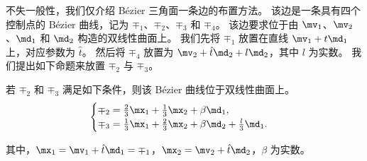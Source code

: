 不失一般性，我们仅介绍 B\'{e}zier 三角面一条边的布置方法。
该边是一条具有四个控制点的 B\'{e}zier 曲线，记为 $\mp_1$、$\mp_2$、$\mp_3$ 和 $\mp_4$。
该边要求位于由 $\mv_1$、$\mv_2$、$\md_1$ 和 $\md_2$ 构造的双线性曲面上。
%
我们先将 $\mp_1$ 放置在直线 $\mv_1 + t \md_1$ 上，对应参数为 $\hat{t}$。
然后将 $\mp_4$ 放置为 $\mv_2 + \hat{t} \md_2 + l \md_2$，其中 $l$ 为实数。
%
我们提出如下命题来放置 $\mp_2$ 与 $\mp_3$。
\begin{prop}\label{prop:bezier-curve}
    若 $\mp_2$ 和 $\mp_3$ 满足如下条件，则该 B\'{e}zier 曲线位于双线性曲面上。
\begin{equation}\label{equ:edge-control-1}
	\begin{cases}
		\mp_2= \frac{2}{3}\mx_1 + \frac{1}{3}\mx_2 + \beta \md_1, &\\
		\mp_3 = \frac{1}{3}\mx_1 + \frac{2}{3}\mx_2 + \beta \md_2+\frac{l}{3}\md_1.&
	\end{cases}
\end{equation}

其中，$\mx_1 = \mv_1 + \hat{t} \md_1 = \mp_1$，$\mx_2 = \mv_2 + \hat{t} \md_2$，$\beta$ 为实数。 %
\end{prop}
